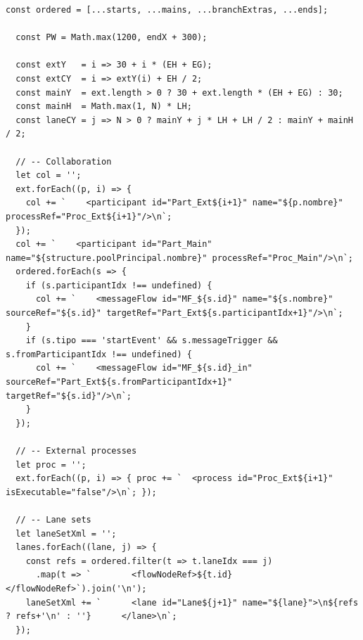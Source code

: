 \begin{lstlisting}[style=promptbox]
  const ordered = [...starts, ...mains, ...branchExtras, ...ends];

  const PW = Math.max(1200, endX + 300);

  const extY   = i => 30 + i * (EH + EG);
  const extCY  = i => extY(i) + EH / 2;
  const mainY  = ext.length > 0 ? 30 + ext.length * (EH + EG) : 30;
  const mainH  = Math.max(1, N) * LH;
  const laneCY = j => N > 0 ? mainY + j * LH + LH / 2 : mainY + mainH / 2;

  // -- Collaboration
  let col = '';
  ext.forEach((p, i) => {
    col += `    <participant id="Part_Ext${i+1}" name="${p.nombre}" processRef="Proc_Ext${i+1}"/>\n`;
  });
  col += `    <participant id="Part_Main" name="${structure.poolPrincipal.nombre}" processRef="Proc_Main"/>\n`;
  ordered.forEach(s => {
    if (s.participantIdx !== undefined) {
      col += `    <messageFlow id="MF_${s.id}" name="${s.nombre}" sourceRef="${s.id}" targetRef="Part_Ext${s.participantIdx+1}"/>\n`;
    }
    if (s.tipo === 'startEvent' && s.messageTrigger && s.fromParticipantIdx !== undefined) {
      col += `    <messageFlow id="MF_${s.id}_in" sourceRef="Part_Ext${s.fromParticipantIdx+1}" targetRef="${s.id}"/>\n`;
    }
  });

  // -- External processes
  let proc = '';
  ext.forEach((p, i) => { proc += `  <process id="Proc_Ext${i+1}" isExecutable="false"/>\n`; });

  // -- Lane sets
  let laneSetXml = '';
  lanes.forEach((lane, j) => {
    const refs = ordered.filter(t => t.laneIdx === j)
      .map(t => `        <flowNodeRef>${t.id}</flowNodeRef>`).join('\n');
    laneSetXml += `      <lane id="Lane${j+1}" name="${lane}">\n${refs ? refs+'\n' : ''}      </lane>\n`;
  });


\end{lstlisting}
